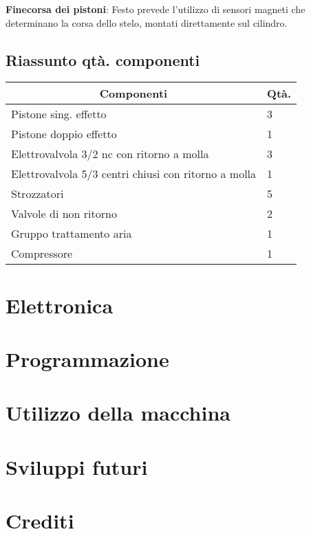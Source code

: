 \documentclass{report}
\begin{document}
\begin{description}
\begin{description}
    \end{description}

\item \textbf{Finecorsa dei pistoni}: Festo prevede l’utilizzo di sensori magneti che determinano la corsa dello stelo, montati direttamente sul cilindro.

\end{description}

\subsection{Riassunto qtà. componenti}

\begin{table}[H]
\centering
\begin{tabular}{|l|l|}
\hline
\multicolumn{1}{|c|}{\textbf{Componenti}} & \textbf{Qtà.} \\ \hline
Pistone sing. effetto & 3 \\ \hline
Pistone doppio effetto & 1 \\ \hline
Elettrovalvola 3/2 nc con ritorno a molla & 3 \\ \hline
Elettrovalvola 5/3 centri chiusi con ritorno a molla & 1 \\ \hline
Strozzatori & 5 \\ \hline
Valvole di non ritorno & 2 \\ \hline
Gruppo trattamento aria & 1 \\ \hline
Compressore & 1 \\ \hline
\end{tabular}
\end{table}



\section{Elettronica}

\section{Programmazione}

\section{Utilizzo della macchina}

\section{Sviluppi futuri}

\section{Crediti}
\end{document}
